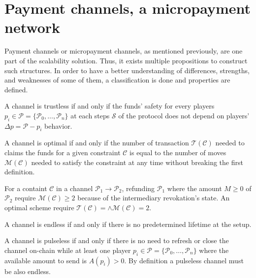 \chapter{Payment channels, a micropayment network}
\label{chap:paymentChannels}

Payment channels or micropayment channels, as mentioned previously, are one part
of the scalability solution. Thus, it exists multiple propositions to construct such
structures. In order to have a better understanding of differences, strengths, and
weaknesses of some of them, a classification is done and properties are defined.

\begin{definition}[trustless]
  A channel is trustless if and only if the funds' safety for every players
  $p_i \in \mathcal{P} = \{\mathcal{P}_0, \dots, \mathcal{P}_n\}$
  at each steps $\mathcal{S}$ of the protocol does not depend on
  players' $\Delta p = \mathcal{P} - p_i$ behavior.
\end{definition}

\begin{definition}[optimal]
  A channel is optimal if and only if the number of transaction $\mathcal{T}(\mathcal{C})$
  needed to claims the funds for a given constraint $\mathcal{C}$ is equal to
  the number of moves $\mathcal{M}(\mathcal{C})$ needed to satisfy the constraint
  at any time without breaking the first definition.

  For a containt $\mathcal{C}$ in a channel $\mathcal{P}_1 \rightarrow \mathcal{P}_2$,
  refunding $\mathcal{P}_1$ where the amount $M \geq 0$ of $\mathcal{P}_2$ require
  $\mathcal{M}(\mathcal{C}) \geq 2$ because of the intermediary revokation's state.
  An optimal scheme require $\mathcal{T}(\mathcal{C}) = \land\mathcal{M}(\mathcal{C}) = 2$.
\end{definition}

\begin{definition}[endless]
  A channel is endless if and only if there is no predetermined lifetime at the setup.
\end{definition}

\begin{definition}[pulseless]
  A channel is pulseless if and only if there is no need to refresh or close the
  channel on-chain while at least one player $p_i \in \mathcal{P} = \{\mathcal{P}_0,
  \dots, \mathcal{P}_n\}$ where the available amount to send is $A(p_i) > 0$. By
  definition a pulseless channel must be also endless.
\end{definition}

